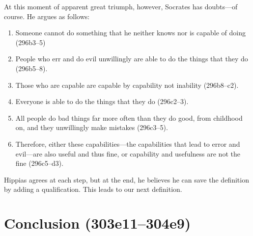 \documentclass[11pt]{article}
\begin{document}
At this moment of apparent great triumph, however, Socrates has doubts---of course.  He argues as follows:

\begin{enumerate}
    \item Someone cannot do something that he neither knows nor is capable of doing (296b3--5)
    \item People who err and do evil unwillingly are able to do the things that they do (296b5--8).
    \item Those who are capable are capable by capability not inability (296b8--c2).
    \item Everyone is able to do the things that they do (296c2--3).
    \item All people do bad things far more often than they do good, from childhood on, and they unwillingly make mistakes (296c3--5).
    \item Therefore, either these capabilities---the capabilities that lead to error and evil---are also useful and thus fine, or capability and usefulness are not the fine (296c5--d3).
\end{enumerate}

Hippias agrees at each step, but at the end, he believes he can save the definition by adding a qualification.  This leads to our next definition.


\section{Conclusion (303e11--304e9)}




\newpage


\end{document}
